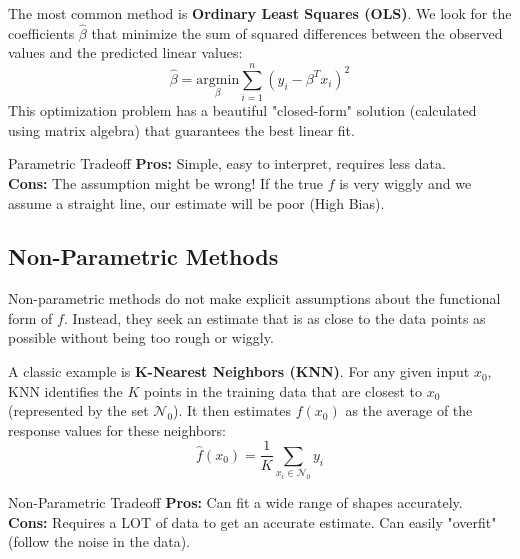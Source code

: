 \documentclass[11pt, a4paper]{article}
\begin{document}
The most common method is \textbf{Ordinary Least Squares (OLS)}. We look for the coefficients $\hat{\beta}$ that minimize the sum of squared differences between the observed values and the predicted linear values:
\[ \hat{\beta} = \underset{\beta}{\text{argmin}} \sum_{i=1}^{n} (y_i - \beta^T x_i)^2 \]
This optimization problem has a beautiful "closed-form" solution (calculated using matrix algebra) that guarantees the best linear fit.

\begin{intuitionbox}{Parametric Tradeoff}
\textbf{Pros:} Simple, easy to interpret, requires less data. \\
\textbf{Cons:} The assumption might be wrong! If the true $f$ is very wiggly and we assume a straight line, our estimate will be poor (High Bias).
\end{intuitionbox}

\subsection{Non-Parametric Methods}
Non-parametric methods do not make explicit assumptions about the functional form of $f$. Instead, they seek an estimate that is as close to the data points as possible without being too rough or wiggly.

A classic example is \textbf{K-Nearest Neighbors (KNN)}. For any given input $x_0$, KNN identifies the $K$ points in the training data that are closest to $x_0$ (represented by the set $\mathcal{N}_0$). It then estimates $f(x_0)$ as the average of the response values for these neighbors:
\[ \hat{f}(x_0) = \frac{1}{K} \sum_{x_i \in \mathcal{N}_0} y_i \]

\begin{intuitionbox}{Non-Parametric Tradeoff}
\textbf{Pros:} Can fit a wide range of shapes accurately. \\
\textbf{Cons:} Requires a LOT of data to get an accurate estimate. Can easily "overfit" (follow the noise in the data).
\end{intuitionbox}
\end{document}
